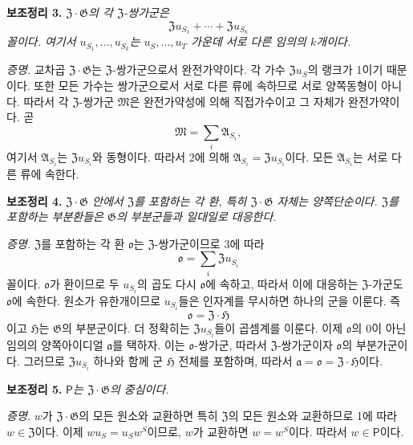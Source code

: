 \noindent\textbf{보조정리 3.} \emph{\(\mathfrak Z\mathbin{\cdot}\mathfrak G\)의 각 \(\mathfrak Z\)-쌍가군은}
\[
        \mathfrak Zu_{S_1}+\cdots+\mathfrak Zu_{S_k}
\]
\emph{꼴이다. 여기서 \(u_{S_1},\ldots,u_{S_k}\)는 \(u_S,\ldots,u_T\) 가운데 서로 다른 임의의 \(k\)개이다.}

\noindent\emph{증명.} 교차곱 \(\mathfrak Z\mathbin{\cdot}\mathfrak G\)는 \(\mathfrak Z\)-쌍가군으로서 완전가약이다. 각 가수 \(\mathfrak Zu_S\)의 랭크가 1이기 때문이다. 또한 모든 가수는 쌍가군으로서 서로 다른 류에 속하므로 서로 양쪽동형이 아니다. 따라서 각 \(\mathfrak Z\)-쌍가군 \(\mathfrak M\)은 완전가약성에 의해 직접가수이고 그 자체가 완전가약이다. 곧
\[
        \mathfrak M=\sum_i\mathfrak A_{S_i},
\]
여기서 \(\mathfrak A_{S_i}\)는 \(\mathfrak Zu_{S_i}\)와 동형이다. 따라서 2에 의해 \(\mathfrak A_{S_i}=\mathfrak Zu_{S_i}\)이다. 모든 \(\mathfrak A_{S_i}\)는 서로 다른 류에 속한다.

\noindent\textbf{보조정리 4.} \emph{\(\mathfrak Z\mathbin{\cdot}\mathfrak G\) 안에서 \(\mathfrak Z\)를 포함하는 각 환, 특히 \(\mathfrak Z\mathbin{\cdot}\mathfrak G\) 자체는 양쪽단순이다. \(\mathfrak Z\)를 포함하는 부분환들은 \(\mathfrak G\)의 부분군들과 일대일로 대응한다.}

\noindent\emph{증명.} \(\mathfrak Z\)를 포함하는 각 환 \(\mathfrak o\)는 \(\mathfrak Z\)-쌍가군이므로 3에 따라
\[
        \mathfrak o=\sum_i\mathfrak Zu_{S_i}
\]
꼴이다. \(\mathfrak o\)가 환이므로 두 \(u_{S_i}\)의 곱도 다시 \(\mathfrak o\)에 속하고, 따라서 이에 대응하는 \(\mathfrak Z\)-가군도 \(\mathfrak o\)에 속한다. 원소가 유한개이므로 \(u_{S_i}\)들은 인자계를 무시하면 하나의 군을 이룬다. 즉
\[
        \mathfrak o=\mathfrak Z\mathbin{\cdot}\mathfrak H
\]
이고 \(\mathfrak H\)는 \(\mathfrak G\)의 부분군이다. 더 정확히는 \(\mathfrak Zu_{S_i}\)들이 곱셈계를 이룬다. 이제 \(\mathfrak o\)의 \(0\)이 아닌 임의의 양쪽아이디얼 \(\mathfrak a\)를 택하자. 이는 \(\mathfrak o\)-쌍가군, 따라서 \(\mathfrak Z\)-쌍가군이자 \(\mathfrak o\)의 부분가군이다. 그러므로 \(\mathfrak Zu_{S_i}\) 하나와 함께 군 \(\mathfrak H\) 전체를 포함하며, 따라서 \(\mathfrak a=\mathfrak o=\mathfrak Z\mathbin{\cdot}\mathfrak H\)이다.

\noindent\textbf{보조정리 5.} \emph{\(\mathsf P\)는 \(\mathfrak Z\mathbin{\cdot}\mathfrak G\)의 중심이다.}

\noindent\emph{증명.} \(w\)가 \(\mathfrak Z\mathbin{\cdot}\mathfrak G\)의 모든 원소와 교환하면 특히 \(\mathfrak Z\)의 모든 원소와 교환하므로 1에 따라 \(w\in\mathfrak Z\)이다. 이제 \(wu_S=u_Sw^S\)이므로, \(w\)가 교환하면 \(w=w^S\)이다. 따라서 \(w\in\mathsf P\)이다.


